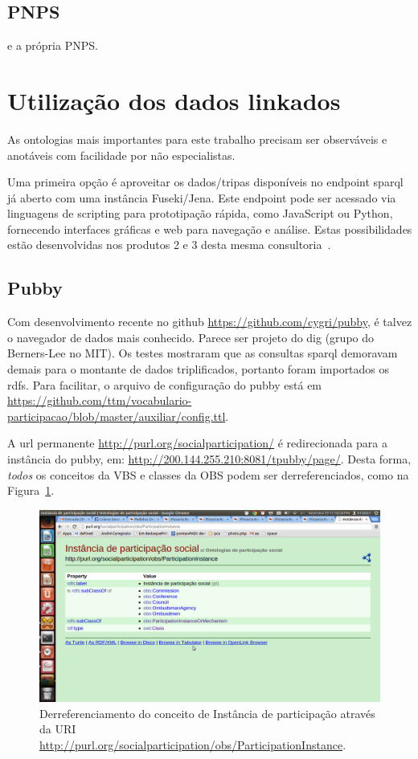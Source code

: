 \documentclass[12pt]{article}
\begin{document}
\subsection{PNPS}\label{ap:pnps}
 e a própria PNPS.

\section{Utilização dos dados linkados}

As ontologias mais importantes para este trabalho precisam ser observáveis e anotáveis com facilidade por não especialistas.

Uma primeira opção é aproveitar os dados/tripas disponíveis no endpoint sparql já aberto com uma instância Fuseki/Jena. Este endpoint pode ser acessado via linguagens de scripting para prototipação rápida, como JavaScript ou Python, fornecendo interfaces gráficas e web para navegação e análise. Estas possibilidades estão desenvolvidas nos produtos 2 e 3 desta mesma consultoria~\cite{prod2, prod3}.

\subsection{Pubby}

Com desenvolvimento recente no github \url{https://github.com/cygri/pubby}, é talvez o navegador de dados mais conhecido. Parece ser projeto do dig (grupo do Berners-Lee no MIT).
Os testes mostraram que as consultas sparql demoravam demais para o montante de dados triplificados, portanto foram importados os rdfs. Para facilitar, o arquivo de configuração do pubby está em \url{https://github.com/ttm/vocabulario-participacao/blob/master/auxiliar/config.ttl}.

A url permanente \url{http://purl.org/socialparticipation/} é redirecionada para a instância do pubby, em: \url{http://200.144.255.210:8081/tpubby/page/}. Desta forma, \emph{todos} os conceitos da VBS e classes da OBS podem ser derreferenciados, como na Figura~\ref{fig:derre}.

\begin{figure}[h!]
  \centering
    \includegraphics[width=\textwidth]{../figs/derre.png}
  \caption{Derreferenciamento do conceito de Instância de participação através da URI \url{http://purl.org/socialparticipation/obs/ParticipationInstance}.}\label{fig:derre}
\end{figure}
\end{document}
